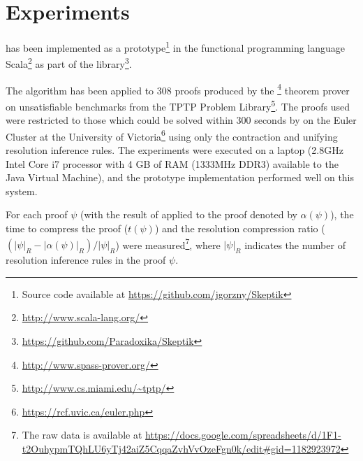 
\section{Experiments} \label{sec:exp}

{\SFOLowerUnits} has been implemented as a prototype\footnote{Source code available at \url{https://github.com/jgorzny/Skeptik}} in the functional programming language Scala\footnote{\url{http://www.scala-lang.org/}} as part of the \skeptik
 library\footnote{\url{https://github.com/Paradoxika/Skeptik}}. 

The algorithm has been applied to 308 proofs produced by the {\SPASS}\footnote{\url{http://www.spass-prover.org/}} theorem prover on unsatisfiable benchmarks from the TPTP Problem Library\footnote{\url{http://www.cs.miami.edu/~tptp/}}. The proofs used were restricted to those which could be solved within 300 seconds by {\SPASS} on the Euler Cluster at the University of Victoria\footnote{\url{https://rcf.uvic.ca/euler.php}} using only the contraction and unifying resolution inference rules. The experiments were executed on a laptop (2.8GHz Intel Core i7 processor with 4 GB of RAM (1333MHz DDR3) available to the Java Virtual Machine), and the prototype implementation performed well on this system.




For each proof $\psi$ (with the result of {\SFOLowerUnits} applied to the proof denoted by $\alpha(\psi)$), the time to compress the proof ($t(\psi)$) and the resolution compression ratio  ($(|\psi|_R-|\alpha(\psi)|_R)/|\psi|_R$) were measured\footnote{The raw data is available at \url{https://docs.google.com/spreadsheets/d/1F1-t2OuhypmTQhLU6yTj42aiZ5CqqaZvhVvOzeFgn0k/edit\#gid=1182923972}}, where $|\psi|_R$ indicates the number of resolution inference rules in the proof $\psi$.

